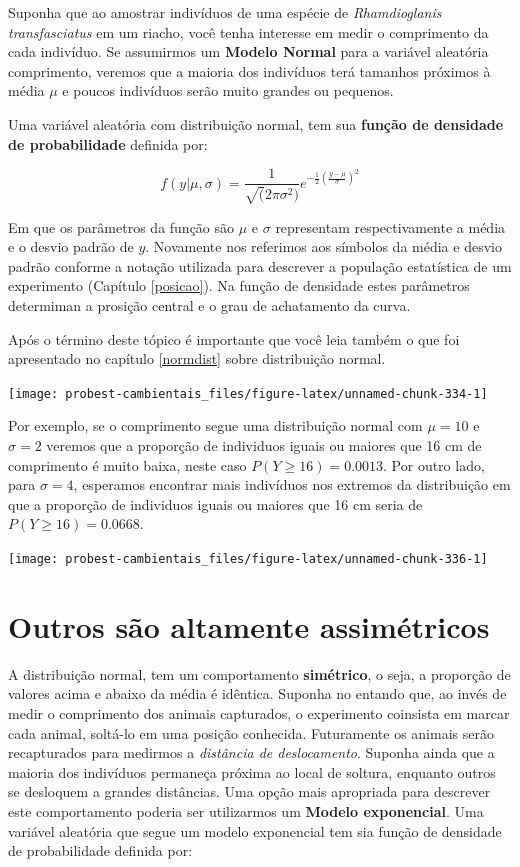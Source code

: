 \documentclass[
]{book}
\begin{document}
Suponha que ao amostrar indivíduos de uma espécie de \emph{Rhamdioglanis transfasciatus} em um riacho, você tenha interesse em medir o comprimento da cada indivíduo. Se assumirmos um \textbf{Modelo Normal} para a variável aleatória comprimento, veremos que a maioria dos indivíduos terá tamanhos próximos à média \(\mu\) e poucos indivíduos serão muito grandes ou pequenos.

Uma variável aleatória com distribuição normal, tem sua \textbf{função de densidade de probabilidade} definida por:

\[f(y|\mu,\sigma) = \frac{1}{\sqrt(2\pi\sigma^2)}e^{-\frac{1}{2}(\frac{y-\mu}{\sigma})^2}\]

Em que os parâmetros da função são \(\mu\) e \(\sigma\) representam respectivamente a média e o desvio padrão de \(y\). Novamente nos referimos aos símbolos da média e desvio padrão conforme a notação utilizada para descrever a população estatística de um experimento (Capítulo \ref{posicao}). Na função de densidade estes parâmetros determiman a prosição central e o grau de achatamento da curva.

Após o término deste tópico é importante que você leia também o que foi apresentado no capítulo \ref{normdist} sobre distribuição normal.

\begin{center}\texttt{[image: probest-cambientais\_files/figure-latex/unnamed-chunk-334-1]} \end{center}

Por exemplo, se o comprimento segue uma distribuição normal com \(\mu = 10\) e \(\sigma = 2\) veremos que a proporção de individuos iguais ou maiores que 16 cm de comprimento é muito baixa, neste caso \(P(Y \ge 16) = 0.0013\). Por outro lado, para \(\sigma = 4\), esperamos encontrar mais indivíduos nos extremos da distribuição em que a proporção de individuos iguais ou maiores que 16 cm seria de \(P(Y \ge 16) = 0.0668\).

\begin{center}\texttt{[image: probest-cambientais\_files/figure-latex/unnamed-chunk-336-1]} \end{center}

\hypertarget{outros-suxe3o-altamente-assimuxe9tricos}{%
\section{Outros são altamente assimétricos}\label{outros-suxe3o-altamente-assimuxe9tricos}}

A distribuição normal, tem um comportamento \textbf{simétrico}, o seja, a proporção de valores acima e abaixo da média é idêntica. Suponha no entando que, ao invés de medir o comprimento dos animais capturados, o experimento coinsista em marcar cada animal, soltá-lo em uma posição conhecida. Futuramente os animais serão recapturados para medirmos a \emph{distância de deslocamento}. Suponha ainda que a maioria dos indivíduos permaneça próxima ao local de soltura, enquanto outros se desloquem a grandes distâncias. Uma opção mais apropriada para descrever este comportamento poderia ser utilizarmos um \textbf{Modelo exponencial}. Uma variável aleatória que segue um modelo exponencial tem sia função de densidade de probabilidade definida por:
\end{document}
